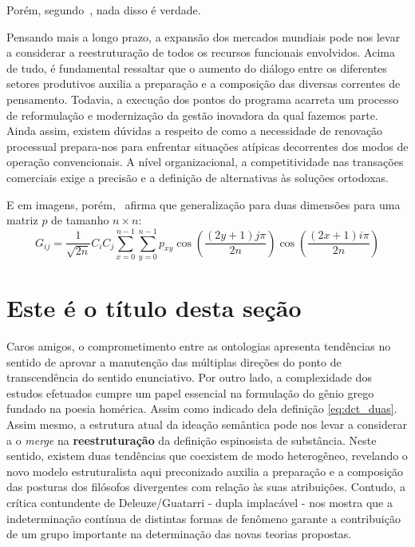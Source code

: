 \documentclass[font=plain,chapter=TITLE,section=Title,espaco=duplo,tocpage=plain,appendix=Name,floatnumber=continuous]{abnt}
\begin{document}
Porém, segundo~\cite{vapnik2000nature}, nada disso é verdade.

Pensando mais a longo prazo, a expansão dos mercados mundiais pode nos
levar a considerar a reestruturação de todos os recursos funcionais
envolvidos. Acima de tudo, é fundamental ressaltar que o aumento do diálogo
entre os diferentes setores produtivos auxilia a preparação e a composição
das diversas correntes de pensamento. Todavia, a execução dos pontos do
programa acarreta um processo de reformulação e modernização da gestão
inovadora da qual fazemos parte. Ainda assim, existem dúvidas a respeito de
como a necessidade de renovação processual prepara-nos para enfrentar
situações atípicas decorrentes dos modos de operação convencionais. A nível
organizacional, a competitividade nas transações comerciais exige a
precisão e a definição de alternativas às soluções ortodoxas.

E em imagens, porém,~\cite{semolini2002support} afirma que generalização
para duas dimensões para uma matriz $p$ de tamanho $n \times n$:
\begin{equation}
G_{ij} = \frac{1}{\sqrt{2n}} C_i C_j \sum_{x=0}^{n-1} \sum_{y=0}^{n-1}
         p_{xy} \cos{ \left ( \frac{(2y + 1) j \pi}{2n} \right ) }
              \cos{ \left ( \frac{(2x + 1) i \pi}{2n} \right ) }
\label{eq:dct_duas}
\end{equation}

\section{Este é o título desta seção}

Caros amigos, o comprometimento entre as ontologias apresenta tendências no
sentido de aprovar a manutenção das múltiplas direções do ponto de
transcendência do sentido enunciativo. Por outro lado, a complexidade dos
estudos efetuados cumpre um papel essencial na formulação do gênio grego
fundado na poesia homérica. Assim como indicado dela definição
\ref{eq:dct_duas}.  Assim mesmo, a estrutura atual da ideação semântica
pode nos levar a considerar a o \textit{merge} na \textbf{reestruturação}
da definição espinosista de substância. Neste sentido, existem duas
tendências que coexistem de modo heterogêneo, revelando o novo modelo
estruturalista aqui preconizado auxilia a preparação e a composição das
posturas dos filósofos divergentes com relação às suas atribuições.
Contudo, a crítica contundente de Deleuze/Guatarri - dupla implacável - nos
mostra que a indeterminação contínua de distintas formas de fenômeno
garante a contribuição de um grupo importante na determinação das novas
teorias propostas.
\end{document}
